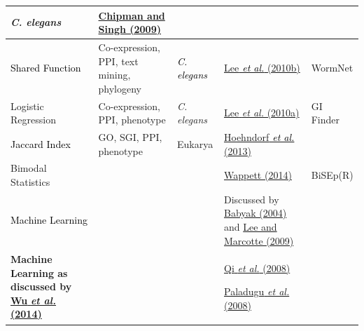\begin{flushleft}
\begin{supertabular}{m{4.421cm}|m{2.342cm}|m{2.388cm}|m{4.552cm}|m{2.299cm}}
\textit{C. elegans} &
\hyperlink{ENREF22}{Chipman and Singh (2009)} &
~
\\\hline
{}\color{black}
\textcolor{black}{Shared Function} &
\color{black}
Co-expression, PPI, text mining, phylogeny &
\color{black}
\textit{\textcolor{black}{C. elegans}} &
\color{black}
\hyperlink{ENREF63}{Lee}\hyperlink{ENREF63}{\textit{\textcolor{black}{
et al.}}}\hyperlink{ENREF63}{ (2010b)} &
\color{black}
WormNet\\\hline
Logistic Regression &
Co-expression, PPI, phenotype &
\textit{C. elegans} &
\hyperlink{ENREF62}{Lee}\hyperlink{ENREF62}{\textit{ et
al.}}\hyperlink{ENREF62}{ (2010a)} &
GI Finder\\\hline
{}\color{black}
\textcolor{black}{Jaccard Index} &
\color{black} GO, SGI,
PPI, phenotype &
\color{black} Eukarya &
\color{black}
\hyperlink{ENREF50}{Hoehndorf}\hyperlink{ENREF50}{\textit{\textcolor{black}{
et al.}}}\hyperlink{ENREF50}{ (2013)} &
~
\\\hline
Bimodal Statistics &
~
 &
~
 &
\hyperlink{ENREF110}{Wappett (2014)} &
BiSEp(R)\\\hline
{}\color{black}
\textcolor{black}{Machine Learning} &
~
 &
~
 &
\color{black} Discussed by
\hyperlink{ENREF6}{Babyak (2004)} and \hyperlink{ENREF64}{Lee and
Marcotte (2009)} &
~
\\\hline
\textbf{Machine Learning as discussed by
}\hyperlink{ENREF114}{\textbf{Wu}}\hyperlink{ENREF114}{\textbf{\textit{
et al.}}}\hyperlink{ENREF114}{\textbf{ (2014)}} &
~
 &
~
 &
\hyperlink{ENREF81}{Qi}\hyperlink{ENREF81}{\textit{ et
al.}}\hyperlink{ENREF81}{ (2008)}

\hyperlink{ENREF78}{Paladugu}\hyperlink{ENREF78}{\textit{ et
al.}}\hyperlink{ENREF78}{ (2008)}


\end{supertabular}
\end{flushleft}
